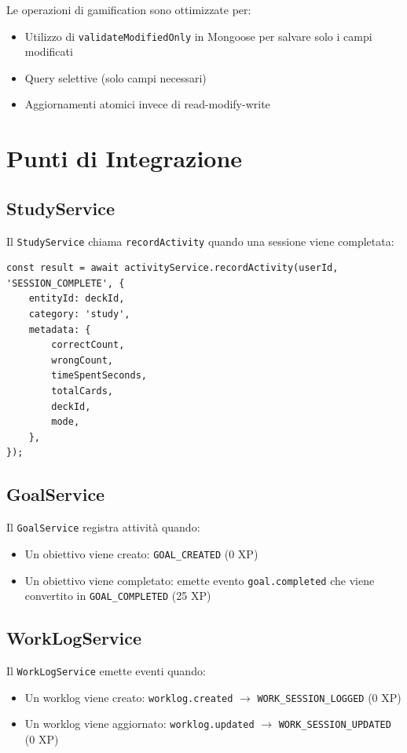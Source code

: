 \documentclass[11pt,a4paper]{article}
\begin{document}
Le operazioni di gamification sono ottimizzate per:
\begin{itemize}
    \item Utilizzo di \texttt{validateModifiedOnly} in Mongoose per salvare solo i campi modificati
    \item Query selettive (solo campi necessari)
    \item Aggiornamenti atomici invece di read-modify-write
\end{itemize}

\section{Punti di Integrazione}

\subsection{StudyService}

Il \texttt{StudyService} chiama \texttt{recordActivity} quando una sessione viene completata:

\begin{lstlisting}
const result = await activityService.recordActivity(userId, 'SESSION_COMPLETE', {
    entityId: deckId,
    category: 'study',
    metadata: {
        correctCount,
        wrongCount,
        timeSpentSeconds,
        totalCards,
        deckId,
        mode,
    },
});
\end{lstlisting}

\subsection{GoalService}

Il \texttt{GoalService} registra attività quando:
\begin{itemize}
    \item Un obiettivo viene creato: \texttt{GOAL\_CREATED} (0 XP)
    \item Un obiettivo viene completato: emette evento \texttt{goal.completed} che viene convertito in \texttt{GOAL\_COMPLETED} (25 XP)
\end{itemize}

\subsection{WorkLogService}

Il \texttt{WorkLogService} emette eventi quando:
\begin{itemize}
    \item Un worklog viene creato: \texttt{worklog.created} $\rightarrow$ \texttt{WORK\_SESSION\_LOGGED} (0 XP)
    \item Un worklog viene aggiornato: \texttt{worklog.updated} $\rightarrow$ \texttt{WORK\_SESSION\_UPDATED} (0 XP)
\end{itemize}
\end{document}

